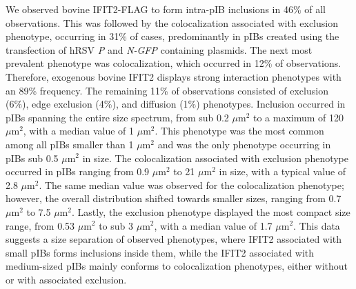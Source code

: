 We observed bovine IFIT2-FLAG to form intra-pIB inclusions in 46\% of all observations. This was followed by the colocalization associated with exclusion phenotype, occurring in 31\% of cases, predominantly in pIBs created using the transfection of hRSV \textit{P} and \textit{N-GFP} containing plasmids. The next most prevalent phenotype was colocalization, which occurred in 12\% of observations. Therefore, exogenous bovine IFIT2 displays strong interaction phenotypes with an 89\% frequency. The remaining 11\% of observations consisted of exclusion (6\%), edge exclusion (4\%), and diffusion (1\%) phenotypes. Inclusion occurred in pIBs spanning the entire size spectrum, from sub 0.2 \(\mu \mbox{m}^2\) to a maximum of 120 \(\mu \mbox{m}^2\), with a median value of 1 \(\mu \mbox{m}^2\). This phenotype was the most common among all pIBs smaller than 1 \(\mu \mbox{m}^2\) and was the only phenotype occurring in pIBs sub 0.5 \(\mu \mbox{m}^2\) in size. The colocalization associated with exclusion phenotype occurred in pIBs ranging from 0.9 \(\mu \mbox{m}^2\) to 21 \(\mu \mbox{m}^2\) in size, with a typical value of 2.8 \(\mu \mbox{m}^2\). The same median value was observed for the colocalization phenotype; however, the overall distribution shifted towards smaller sizes, ranging from 0.7 \(\mu \mbox{m}^2\) to 7.5 \(\mu \mbox{m}^2\). Lastly, the exclusion phenotype displayed the most compact size range, from 0.53 \(\mu \mbox{m}^2\) to sub 3 \(\mu \mbox{m}^2\), with a median value of 1.7 \(\mu \mbox{m}^2\). This data suggests a size separation of observed phenotypes, where IFIT2 associated with small pIBs forms inclusions inside them, while the IFIT2 associated with medium-sized pIBs mainly conforms to colocalization phenotypes, either without or with associated exclusion.

